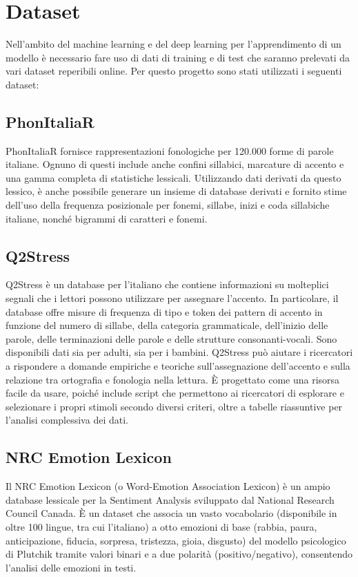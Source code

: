 \section{Dataset}
Nell'ambito del machine learning e del deep learning per l'apprendimento di un modello è necessario fare uso di dati di training e di test che saranno prelevati da vari dataset reperibili online. Per questo progetto sono stati utilizzati i seguenti dataset:

\subsection{PhonItaliaR}
PhonItaliaR fornisce rappresentazioni fonologiche per 120.000 forme di parole italiane. Ognuno di questi include anche confini sillabici, marcature di accento e una gamma completa di statistiche lessicali.
Utilizzando dati derivati da questo lessico, è anche possibile generare un insieme di database derivati e fornito stime dell'uso della frequenza posizionale per fonemi, sillabe, inizi e coda sillabiche italiane, nonché bigrammi di caratteri e fonemi.



\subsection{Q2Stress}
Q2Stress è un database per l'italiano che contiene informazioni su molteplici segnali che i lettori possono
utilizzare per assegnare l'accento. In particolare, il database offre misure di frequenza di tipo e token dei pattern di accento in funzione del numero 
di sillabe, della categoria grammaticale, dell'inizio delle parole, delle terminazioni delle parole e delle strutture consonanti-vocali. Sono disponibili dati 
sia per adulti, sia per i bambini.
Q2Stress può aiutare i ricercatori a rispondere a domande empiriche e teoriche sull'assegnazione dell'accento e sulla relazione tra ortografia e fonologia 
nella lettura. È progettato come una risorsa facile da usare, poiché include script che permettono ai ricercatori di esplorare e selezionare i propri 
stimoli secondo diversi criteri, oltre a tabelle riassuntive per l'analisi complessiva dei dati.



 \subsection{NRC Emotion Lexicon}
 Il NRC Emotion Lexicon (o Word-Emotion Association Lexicon) è un ampio database lessicale per la Sentiment Analysis sviluppato dal National Research Council 
 Canada. È un dataset che associa un vasto vocabolario (disponibile in oltre 100 lingue, tra cui l'italiano) a otto emozioni di base (rabbia, paura, 
 anticipazione, fiducia, sorpresa, tristezza, gioia, disgusto) del modello psicologico di Plutchik tramite valori binari e a due polarità (positivo/negativo), 
 consentendo l'analisi delle emozioni in testi.

